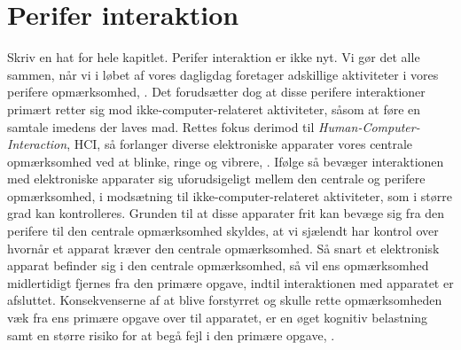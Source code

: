 \chapter{Perifer interaktion}
\label{PeriferInteratkion}
%
Skriv en hat for hele kapitlet. \blankline
%
Perifer interaktion er ikke nyt. Vi gør det alle sammen, når vi i løbet af vores dagligdag foretager adskillige aktiviteter i vores perifere opmærksomhed, \parencite[s. 1]{PDF:PeripheralInteraction}. Det forudsætter dog at disse perifere interaktioner primært retter sig mod ikke-computer-relateret aktiviteter, såsom at føre en samtale imedens der laves mad. Rettes fokus derimod til \textit{Human-Computer-Interaction}, HCI, så forlanger diverse elektroniske apparater vores centrale opmærksomhed ved at blinke, ringe og vibrere, \parencite[s. 1]{PDF:PeripheralInteraction}. Ifølge \textcite[s. 3]{PDF:PeripheralInteraction} så bevæger interaktionen med elektroniske apparater sig uforudsigeligt mellem den centrale og perifere opmærksomhed, i modsætning til ikke-computer-relateret aktiviteter, som i større grad kan kontrolleres. Grunden til at disse apparater frit kan bevæge sig fra den perifere til den centrale opmærksomhed skyldes, at vi sjælendt har kontrol over hvornår et apparat kræver den centrale opmærksomhed. Så snart et elektronisk apparat befinder sig i den centrale opmærksomhed, så vil ens opmærksomhed midlertidigt fjernes fra den primære opgave, indtil interaktionen med apparatet er afsluttet. Konsekvenserne af at blive forstyrret og skulle rette opmærksomheden væk fra ens primære opgave over til apparatet, er en øget kognitiv belastning samt en større risiko for at begå fejl i den primære opgave, \parencite[ss. 188-189][s. 162]{PDF:PeripheralInteraction, PDF:ComparingInputModalities}. 

